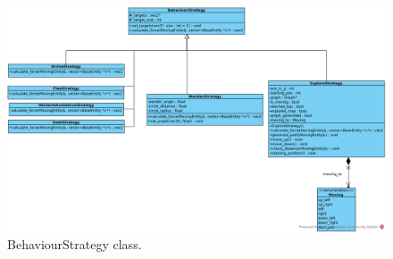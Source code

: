 \begin{figure}[!htb]
\centering
\includegraphics[angle=-90,origin=c,scale=0.6]{res/steering/BehaviourStrategy.png}
\caption{BehaviourStrategy class.}\label{fig:behaviourstrategy}
\end{figure}

